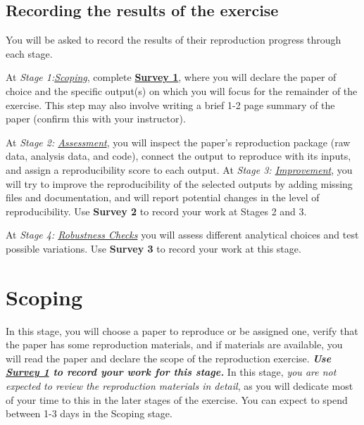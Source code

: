 \documentclass[]{book}
\begin{document}
\hypertarget{recording-the-results-of-the-exercise}{%
\section*{Recording the results of the exercise}\label{recording-the-results-of-the-exercise}}

You will be asked to record the results of their reproduction progress through each stage.

At \emph{Stage 1:\protect\hyperlink{scoping}{Scoping}}, complete \textbf{\href{https://berkeley.qualtrics.com/jfe/form/SV_8hLHNI6LGSYchEN}{Survey 1}}, where you will declare the paper of choice and the specific output(s) on which you will focus for the remainder of the exercise. This step may also involve writing a brief 1-2 page summary of the paper (confirm this with your instructor).

At \emph{Stage 2: \protect\hyperlink{assessment}{Assessment}}, you will inspect the paper's reproduction package (raw data, analysis data, and code), connect the output to reproduce with its inputs, and assign a reproducibility score to each output. At \emph{Stage 3: \protect\hyperlink{improvements}{Improvement}}, you will try to improve the reproducibility of the selected outputs by adding missing files and documentation, and will report potential changes in the level of reproducibility. Use \textbf{Survey 2} to record your work at Stages 2 and 3.

At \emph{Stage 4: \protect\hyperlink{robust}{Robustness Checks}} you will assess different analytical choices and test possible variations. Use \textbf{Survey 3} to record your work at this stage.

\hypertarget{scoping}{%
\chapter{Scoping}\label{scoping}}

In this stage, you will choose a paper to reproduce or be assigned one, verify that the paper has some reproduction materials, and if materials are available, you will read the paper and declare the scope of the reproduction exercise. \textbf{\emph{Use \href{https://berkeley.qualtrics.com/jfe/form/SV_3UWe5xu3qjeh0c5}{Survey 1} to record your work for this stage.}} In this stage, \emph{you are not expected to review the reproduction materials in detail}, as you will dedicate most of your time to this in the later stages of the exercise. You can expect to spend between 1-3 days in the Scoping stage.
\end{document}
